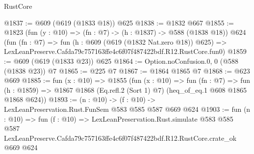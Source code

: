 \begin{lexlean}{RustCore}
\begin{coremodule}
@1837 := @609 (@619 (@1833 @18)) @625
@1838 := @1832 @667
@1855 := @1823
    (fun (y : @10) => (fn : @7) -> (h : @1837) -> @588 (@1838 @18))
    @624
    (fun (fn : @7) =>
    fun (h : @609 (@619 (@1832 Nat.zero @18)) @625) =>
    LexLeanPreserve.Cafda79c757163ffe4c6f07f487422bdf.R12.RustCore.fun0)
@1859 := @609 (@619 (@1833 @23)) @625
@1864 := Option.noConfusion.{0, 0} (@588 (@1838 @23)) @7
@1865 := @225 @7
@1867 := @1864 @1865 @7
@1868 := @623 @669
@1885 := fun (x : @10) =>
  @1855
    (fun (x : @10) =>
    fun (fn : @7) =>
    fun (h : @1859) => @1867 @1868 (Eq.refl.{2} (Sort 1) @7) (heq_of_eq.{1} @608 @1865 @1868 @624))
@1893 := (n : @10) -> (f : @10) -> LexLeanPreservation.Rust.FunSem @583 @585 @587 @669 @624
@1903 := fun (n : @10) =>
  fun (f : @10) =>
  LexLeanPreservation.Rust.simulate
    @583
    @585
    @587
    LexLeanPreserve.Cafda79c757163ffe4c6f07f487422bdf.R12.RustCore.crate_ok
    @669
    @624
\end{coremodule}
\end{lexlean}
